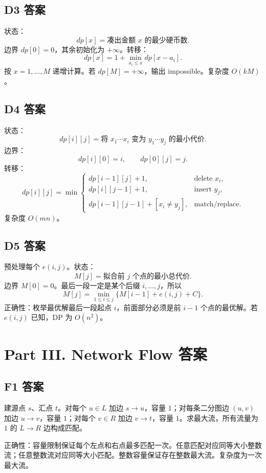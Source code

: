 \documentclass[UTF8,a4paper,11pt]{ctexart}
\begin{document}
\subsection*{D3 答案}

状态：
\[
dp[x]=\text{凑出金额 }x\text{ 的最少硬币数}.
\]
边界 $dp[0]=0$，其余初始化为 $+\infty$。转移：
\[
dp[x]=1+\min_{a_i\le x}dp[x-a_i].
\]
按 $x=1,\ldots,M$ 递增计算。若 $dp[M]=+\infty$，输出 impossible。复杂度 $O(kM)$。

\subsection*{D4 答案}

状态：
\[
dp[i][j]=\text{将 }x_1\cdots x_i\text{ 变为 }y_1\cdots y_j\text{ 的最小代价}.
\]
边界：
\[
dp[i][0]=i,\qquad dp[0][j]=j.
\]
转移：
\[
dp[i][j]=\min\begin{cases}
dp[i-1][j]+1, & \text{delete }x_i,\\
dp[i][j-1]+1, & \text{insert }y_j,\\
dp[i-1][j-1]+[x_i\ne y_j], & \text{match/replace}.
\end{cases}
\]
复杂度 $O(mn)$。

\subsection*{D5 答案}

预处理每个 $e(i,j)$。状态：
\[
M[j]=\text{拟合前 }j\text{ 个点的最小总代价}.
\]
边界 $M[0]=0$。最后一段一定是某个后缀 $i,\ldots,j$，所以
\[
M[j]=\min_{1\le i\le j}\{M[i-1]+e(i,j)+C\}.
\]
正确性：枚举最优解最后一段起点 $i$，前面部分必须是前 $i-1$ 个点的最优解。若 $e(i,j)$ 已知，DP 为 $O(n^2)$。

\newpage
\section*{Part III. Network Flow 答案}

\subsection*{F1 答案}

建源点 $s$、汇点 $t$。对每个 $u\in L$ 加边 $s\to u$，容量 $1$；对每条二分图边 $(u,v)$ 加边 $u\to v$，容量 $1$；对每个 $v\in R$ 加边 $v\to t$，容量 $1$。求最大流，所有流量为 $1$ 的 $L\to R$ 边构成匹配。

正确性：容量限制保证每个左点和右点最多匹配一次。任意匹配对应同等大小整数流；任意整数流对应同等大小匹配。整数容量保证存在整数最大流。复杂度为一次最大流。
\end{document}
